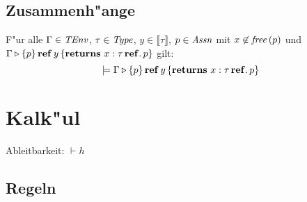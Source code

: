 \documentclass[12pt,a4paper,bigheadings]{scrartcl}
\newcommand{\semantic}[1]{\ensuremath{\llbracket#1\rrbracket}}
\newcommand{\TEnv}{\name{TEnv}}
\newcommand{\Assn}{\name{Assn}}
\begin{document}
\subsection{Zusammenh"ange}

\begin{lemma}
  F"ur alle $\Gamma\in\TEnv$, $\tau\in{\text{\it Type\/}}$, $y\in\semantic{\tau}$, $p \in\Assn$ mit
  $x \not \in {\text{\it free\/}}\,(p)$ und $\Gamma \triangleright \{p\}\,\mathbf{ref}\,y\,\{{\bf returns}\ x:\tau\,\mathbf{ref}.\, p\}$ gilt:
  \[
    \models \Gamma \triangleright \{p\}\,\mathbf{ref}\,y\,\{{\bf returns}\ x:\tau\,\mathbf{ref}.\, p\}
  \]
\end{lemma}



\section{Kalk"ul}

Ableitbarkeit: $\vdash h$

\subsection{Regeln}
\end{document}
